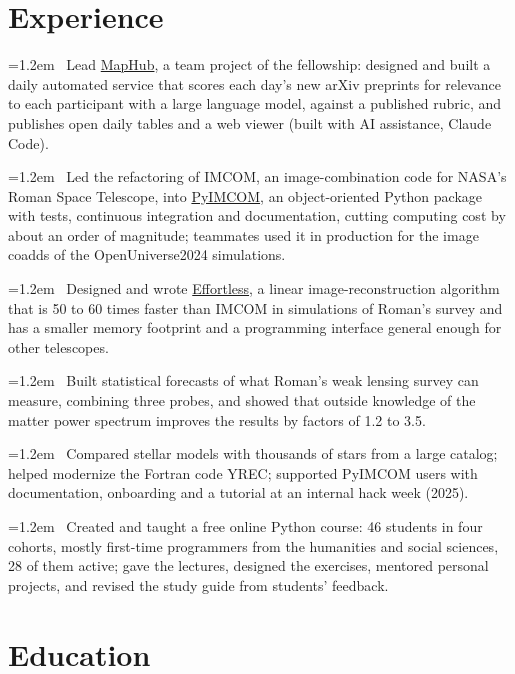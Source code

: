 \documentclass[11pt]{article}
\newcommand{\cvbullet}[1]{\par\hangindent=1.2em\hangafter=1 \textbullet\ #1\par\vspace{1pt}}
\begin{document}
\section{Experience}
\cvbullet{Lead \href{https://kailicao.github.io/maphub-public/}{MapHub}, a team project of the fellowship: designed and built a daily automated service that scores each day's new arXiv preprints for relevance to each participant with a large language model, against a published rubric, and publishes open daily tables and a web viewer (built with AI assistance, Claude Code).}
\cvbullet{Led the refactoring of IMCOM, an image-combination code for NASA's Roman Space Telescope, into \href{https://github.com/Roman-HLIS-Cosmology-PIT/pyimcom}{PyIMCOM}, an object-oriented Python package with tests, continuous integration and documentation, cutting computing cost by about an order of magnitude; teammates used it in production for the image coadds of the OpenUniverse2024 simulations.}
\cvbullet{Designed and wrote \href{https://github.com/Roman-HLIS-Cosmology-PIT/effortless}{Effortless}, a linear image-reconstruction algorithm that is 50 to 60 times faster than IMCOM in simulations of Roman's survey and has a smaller memory footprint and a programming interface general enough for other telescopes.}
\cvbullet{Built statistical forecasts of what Roman's weak lensing survey can measure, combining three probes, and showed that outside knowledge of the matter power spectrum improves the results by factors of 1.2 to 3.5.}
\cvbullet{Compared stellar models with thousands of stars from a large catalog; helped modernize the Fortran code YREC; supported PyIMCOM users with documentation, onboarding and a tutorial at an internal hack week (2025).}
\cvbullet{Created and taught a free online Python course: 46 students in four cohorts, mostly first-time programmers from the humanities and social sciences, 28 of them active; gave the lectures, designed the exercises, mentored personal projects, and revised the study guide from students' feedback.}

\section{Education}
\end{document}
